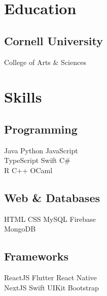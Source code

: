 \documentclass[]{main}
\begin{document}
%
%

%
%

\begin{minipage}[t]{0.33\textwidth} 


\section{Education} 

\subsection{Cornell University}
College of Arts \& Sciences \\
\sectionsep


\section{Skills}
\subsection{Programming}
Java \textbullet{} Python \textbullet{} JavaScript \textbullet{} \\ TypeScript \textbullet{} Swift \textbullet{} C\# \textbullet{} \\ R \textbullet{} C++ \textbullet{} OCaml
\sectionsep

\subsection{Web \& Databases}
HTML \textbullet{} CSS \textbullet{} MySQL \textbullet{} Firebase \\ \textbullet{} MongoDB
\sectionsep

\subsection{Frameworks}
ReactJS \textbullet{} Flutter \textbullet{} React Native \textbullet{} \\ NextJS \textbullet{} Swift UIKit \textbullet{} Bootstrap
\sectionsep


\end{minipage}
\end{document}
